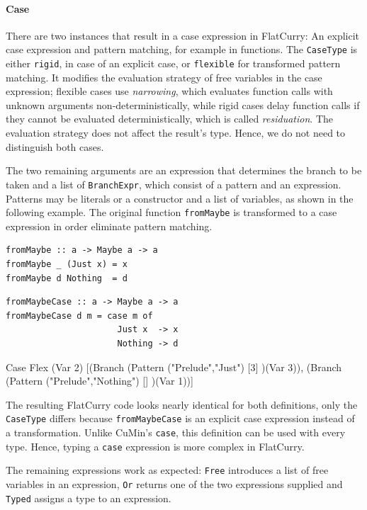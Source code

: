\documentclass[fleqn, abstract=on]{scrreprt}
\newcommand{\todo}[1]{\marginpar{\textbf{TODO:} #1}}
\newcommand{\coqinline}[1]{\texttt{#1}}
\begin{document}
\paragraph{Case}
There are two instances that result in a case expression in FlatCurry: An explicit case expression and pattern matching, for example in functions. The \coqinline{CaseType} is either \coqinline{rigid}, in case of an explicit case, or \coqinline{flexible} for transformed pattern matching. It modifies the evaluation strategy of free variables in the case expression; flexible cases use \textit{narrowing}, which evaluates function calls with unknown arguments non-deterministically, while rigid cases delay function calls if they cannot be evaluated deterministically, which is called \textit{residuation}.\cite{Hanus13} \todo{Stimmt das?}
The evaluation strategy does not affect the result's type. Hence, we do not need to distinguish both cases.
\par
The two remaining arguments are an expression that determines the branch to be taken and a list of \coqinline{BranchExpr}, which consist of a pattern and an expression. Patterns may be literals or a constructor and a list of variables, as shown in the following example. The original function \texttt{fromMaybe} is transformed to a case expression in order eliminate pattern matching.\\
\par
\begin{minipage}[t]{.5\linewidth}
\begin{verbatim}
fromMaybe :: a -> Maybe a -> a
fromMaybe _ (Just x) = x
fromMaybe d Nothing  = d
\end{verbatim}
\end{minipage}
\begin{minipage}[t]{.5\linewidth}
\begin{verbatim}
fromMaybeCase :: a -> Maybe a -> a
fromMaybeCase d m = case m of
                      Just x  -> x
                      Nothing -> d
\end{verbatim}
\end{minipage}
\begin{coqcode}
Case Flex (Var 2) [(Branch (Pattern ("Prelude","Just") [3] )(Var 3)),
                   (Branch (Pattern ("Prelude","Nothing") [] )(Var 1))]
\end{coqcode}
The resulting FlatCurry code looks nearly identical for both definitions, only the \coqinline{CaseType} differs because \texttt{fromMaybeCase} is an explicit case expression instead of a transformation. Unlike CuMin's \texttt{case}, this definition can be used with every type. Hence, typing a \texttt{case} expression is more complex in FlatCurry.\\
\par
The remaining expressions work as expected: \texttt{Free} introduces a list of free variables in an expression, \texttt{Or} returns one of the two expressions supplied and \texttt{Typed} assigns a type to an expression. \todo{Weglassen?}
\end{document}
